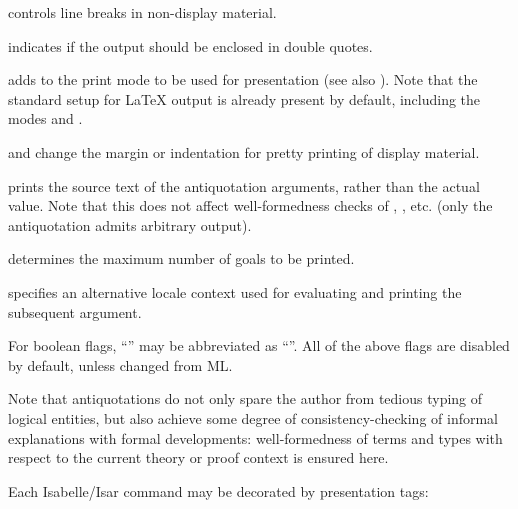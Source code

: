 \begin{isabellebody}
\begin{isamarkuptext}
\begin{descr}
  \item[\isa{{\isachardoublequote}break\ {\isacharequal}\ bool{\isachardoublequote}}] controls line breaks in non-display
  material.

  \item[\isa{{\isachardoublequote}quotes\ {\isacharequal}\ bool{\isachardoublequote}}] indicates if the output should be
  enclosed in double quotes.

  \item[\isa{{\isachardoublequote}mode\ {\isacharequal}\ name{\isachardoublequote}}] adds  to the print mode to
  be used for presentation (see also \cite{isabelle-ref}).  Note that
  the standard setup for {\LaTeX} output is already present by
  default, including the modes  and .

  \item[\isa{{\isachardoublequote}margin\ {\isacharequal}\ nat{\isachardoublequote}} and \isa{{\isachardoublequote}indent\ {\isacharequal}\ nat{\isachardoublequote}}] change the
  margin or indentation for pretty printing of display material.

  \item[\isa{{\isachardoublequote}source\ {\isacharequal}\ bool{\isachardoublequote}}] prints the source text of the
  antiquotation arguments, rather than the actual value.  Note that
  this does not affect well-formedness checks of \hyperlink{antiquotation.thm}{\mbox{}}, \hyperlink{antiquotation.term}{\mbox{}}, etc. (only the \hyperlink{antiquotation.text}{\mbox{}} antiquotation admits arbitrary output).

  \item[\isa{{\isachardoublequote}goals{\isacharunderscore}limit\ {\isacharequal}\ nat{\isachardoublequote}}] determines the maximum number of
  goals to be printed.

  \item[\isa{{\isachardoublequote}locale\ {\isacharequal}\ name{\isachardoublequote}}] specifies an alternative locale
  context used for evaluating and printing the subsequent argument.

  \end{descr}

  For boolean flags, ``'' may be abbreviated as
  ``''.  All of the above flags are disabled by default,
  unless changed from ML.

  \medskip Note that antiquotations do not only spare the author from
  tedious typing of logical entities, but also achieve some degree of
  consistency-checking of informal explanations with formal
  developments: well-formedness of terms and types with respect to the
  current theory or proof context is ensured here.%
\end{isamarkuptext}%
\isamarkuptrue%
%
\isamarkuptrue%
%
\begin{isamarkuptext}%
Each Isabelle/Isar command may be decorated by presentation tags:


\end{isamarkuptext}
\end{isabellebody}
